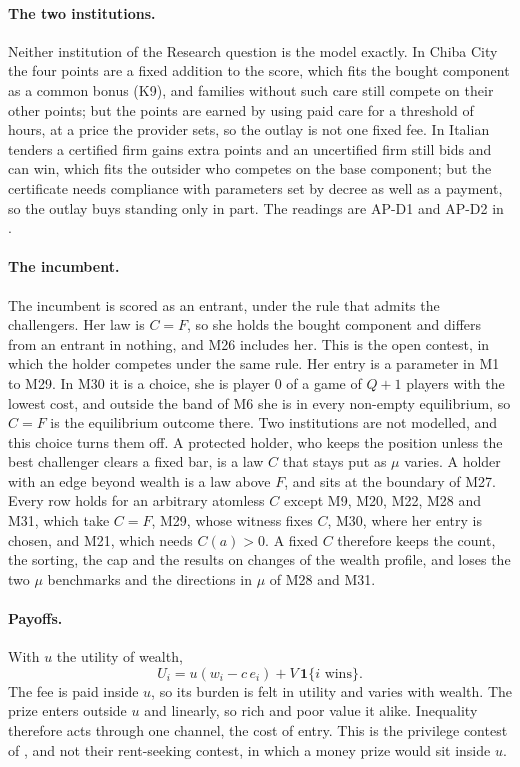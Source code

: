\paragraph{The two institutions.} Neither institution of the Research question
is the model exactly. In Chiba City the four points are a fixed addition to the
score, which fits the bought component as a common bonus (K9), and families
without such care still compete on their other points; but the points are
earned by using paid care for a threshold of hours, at a price the provider
sets, so the outlay is not one fixed fee. In Italian tenders a certified firm
gains extra points and an uncertified firm still bids and can win, which fits
the outsider who competes on the base component; but the certificate needs
compliance with parameters set by decree as well as a payment, so the outlay
buys standing only in part. The readings are AP-D1 and AP-D2 in
.

\paragraph{The incumbent.} The incumbent is scored as an entrant, under the
rule that admits the challengers. Her law is $C=F$, so she holds the bought
component and differs from an entrant in nothing, and M26 includes her. This is the open contest,
in which the holder competes under the same rule. Her entry is a
parameter in M1 to M29. In M30 it is a choice, she is player $0$ of a game of
$Q+1$ players with the lowest cost, and outside the band of M6 she is in every
non-empty equilibrium, so $C=F$ is the equilibrium outcome there. Two
institutions are not modelled, and this choice turns them off. A protected
holder, who keeps the position unless the best challenger clears a fixed bar,
is a law $C$ that stays put as $\mu$ varies. A holder with an edge beyond
wealth is a law above $F$, and sits at the boundary of M27. Every row holds
for an arbitrary atomless $C$ except M9, M20, M22, M28 and M31, which take
$C=F$, M29, whose witness fixes $C$, M30, where her entry is chosen, and M21,
which needs $C(a)>0$. A fixed $C$ therefore keeps the count, the sorting, the
cap and the results on changes of the wealth profile, and loses the two $\mu$
benchmarks and the
directions in $\mu$ of M28 and M31.

\paragraph{Payoffs.} With $u$ the utility of wealth,
\[
  U_i=u(w_i-c\,e_i)+V\,\mathbf 1\{i\text{ wins}\}.
\]
The fee is paid inside $u$, so its burden is felt in utility and varies with
wealth. The prize enters outside $u$ and linearly, so rich and poor value it
alike. Inequality therefore acts through one channel, the cost of entry. This
is the privilege contest of \citet{SchroyenTreich2016}, and not their
rent-seeking contest, in which a money prize would sit inside $u$.

